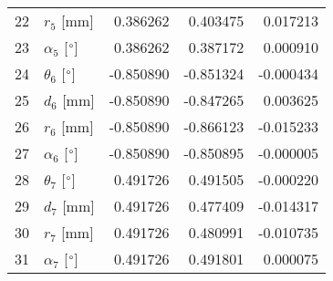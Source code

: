\documentclass{standalone}%
\begin{document}
\begin{tabular}{llrrr}
22 &              $r_{5}$ [mm] &  0.386262 &   0.403475 &   0.017213 \\
23 &  $\alpha_{5}$ [$\degree$] &  0.386262 &   0.387172 &   0.000910 \\
24 &  $\theta_{6}$ [$\degree$] & -0.850890 &  -0.851324 &  -0.000434 \\
25 &              $d_{6}$ [mm] & -0.850890 &  -0.847265 &   0.003625 \\
26 &              $r_{6}$ [mm] & -0.850890 &  -0.866123 &  -0.015233 \\
27 &  $\alpha_{6}$ [$\degree$] & -0.850890 &  -0.850895 &  -0.000005 \\
28 &  $\theta_{7}$ [$\degree$] &  0.491726 &   0.491505 &  -0.000220 \\
29 &              $d_{7}$ [mm] &  0.491726 &   0.477409 &  -0.014317 \\
30 &              $r_{7}$ [mm] &  0.491726 &   0.480991 &  -0.010735 \\
31 &  $\alpha_{7}$ [$\degree$] &  0.491726 &   0.491801 &   0.000075 \\
\bottomrule
\end{tabular}
%
\end{document}
